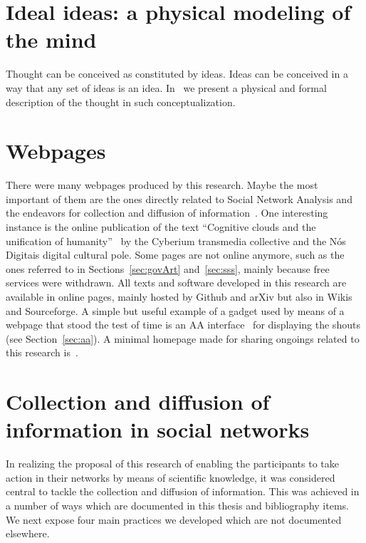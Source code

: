 \begin{apendicesenv}
\section{Ideal ideas: a physical modeling of the mind}
Thought can be conceived as constituted by ideas.
Ideas can be conceived in a way that any set of ideas is an idea.
In~\cite{idealIdeas} we present a physical and formal description of the
thought in such conceptualization.

\section{Webpages}
There were many webpages produced by this research.
Maybe the most important of them are the ones directly related
to Social Network Analysis and the endeavors for collection and diffusion of information~\cite{sfARS,rfARS}.
One interesting instance is the online publication of the text ``Cognitive clouds and the unification of humanity''~\cite{nuvens}
by the Cyberium transmedia collective and the Nós Digitais digital cultural pole.
Some pages are not online anymore, such as the ones referred to in Sections~\ref{sec:govArt} and~\ref{sec:sss},
mainly because free services were withdrawn.
All texts and software developed in this research are available in online pages,
mainly hosted by Github and arXiv but also in Wikis and Sourceforge.
A simple but useful example of a gadget used by means of a webpage that
stood the test of time is an AA interface~\cite{aaclient} for displaying the shouts
(see Section~\ref{sec:aa}).
A minimal homepage made for sharing ongoings related to this research is~\cite{ttmio}.

\section{Collection and diffusion of information in social networks}\label{sec:colDif}
In realizing the proposal of this research of enabling the participants to take action
in their networks by means of scientific knowledge, it was considered central
to tackle the collection and diffusion of information.
This was achieved in a number of ways which are documented in this thesis and bibliography items.
We next expose four main practices we developed which are not documented elsewhere.


\end{apendicesenv}
